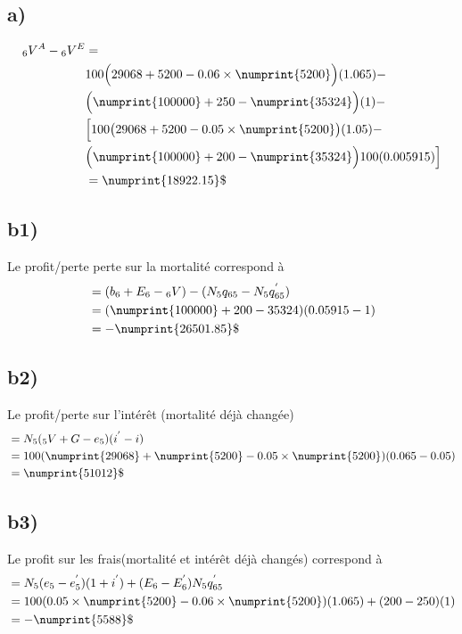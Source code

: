 \documentclass[11pt,french]{report}
\newcommand{\indiceGauche}[2]{{\vphantom{#2}}_{#1}#2}
\begin{document}
\subsection*{a)}
\begin{align*}
\indiceGauche{6}{V}^{A} - \indiceGauche{6}{V}^{E} &= \\
& 100\Big( 29068 + 5200 - 0.06 \times \numprint{5200}\Big)(1.065) - \\
&\Big(\numprint{100000} + 250 -\numprint{35324} \Big)(1) -\\
&\Big [   100 \big(29068 + 5200 - 0.05 \times \numprint{5200}\big)(1.05) -\\
& \Big(\numprint{100000} + 200 - \numprint{35324} \Big)100 (0.005915) \Big]\\
&= \numprint{18922.15} \$
\end{align*}
\subsection*{b1)}
Le profit/perte perte sur la mortalité correspond à
\begin{align*}
&= ( b_6 +E_6 - \indiceGauche{6}{V}) -(N_5 q_{65} - N_5 q_{65}^{'}) \\
&= (\numprint{100000} + 200 -35324)(0.05915 - 1)\\
&= - \numprint{26501.85}\$
\end{align*}
\subsection*{b2)}
Le profit/perte sur l'intérêt (mortalité déjà changée)
\begin{align*}
&= N_5 ( \indiceGauche{5}{V} + G - e_5)(i^{'} - i) \\
&= 100(\numprint{29068}+ \numprint{5200} -0.05 \times \numprint{5200})(0.065-0.05) \\
&= \numprint{51012}\$
\end{align*}
\subsection*{b3)}
Le profit sur les frais(mortalité et intérêt déjà changés) correspond à
\begin{align*}
&= N_5 ( e_5 - e_5^{'} )(1+i^{'}) + (E_{6} - E_{6}^{'} ) N_5 q_{65}^{'}\\
&= 100(0.05\times \numprint{5200} - 0.06 \times \numprint{5200})(1.065) + (200-250)(1) \\
&= -\numprint{5588}\$
\end{align*}
\end{document}
